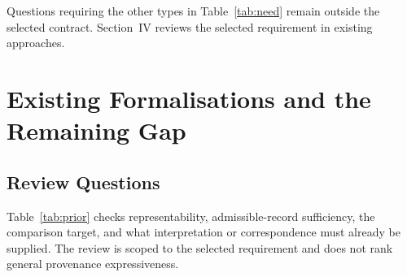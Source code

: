 \documentclass[conference]{IEEEtran}
\theoremstyle{tideproposition}
\begin{document}
Questions requiring the other types in Table~\ref{tab:need} remain outside the selected contract. Section~IV reviews the selected requirement in existing approaches.

\section{Existing Formalisations and the Remaining Gap}

\subsection{Review Questions}
Table~\ref{tab:prior} checks representability, admissible-record sufficiency, the comparison target, and what interpretation or correspondence must already be supplied. The review is scoped to the selected requirement and does not rank general provenance expressiveness.
\end{document}
